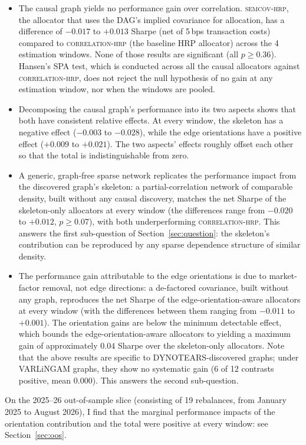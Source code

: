 \documentclass[11pt, a4paper]{report}
\newcommand{\corrhrp}{\textsc{correlation-hrp}}
\newcommand{\semcovhrp}{\textsc{semcov-hrp}}
\begin{document}
\begin{itemize}[itemsep=2pt, topsep=3pt]
  \item The causal graph yields no performance gain over correlation. \semcovhrp{}, the allocator that uses the DAG's implied covariance for allocation, has a difference of $-0.017$ to $+0.013$ Sharpe (net of 5\,bps transaction costs) compared to \corrhrp{} (the baseline HRP allocator) across the 4 estimation windows. None of those results are significant (all $p \geq 0.36$). 
  Hansen's SPA test, which is conducted across all the causal allocators against \corrhrp{}, does not reject the null hypothesis of no gain at any estimation window, nor when the windows are pooled.
  \item Decomposing the causal graph's performance into its two aspects shows that both have consistent relative effects. At every window, the skeleton has a negative effect ($-0.003$ to $-0.028$), while the edge orientations have a positive effect ($+0.009$ to $+0.021$). The two aspects' effects roughly offset each other so that the total is indistinguishable from zero.
  \item A generic, graph-free sparse network replicates the performance impact from the discovered graph's skeleton: a partial-correlation network of comparable density, built without any causal discovery, matches the net Sharpe of the skeleton-only allocators at every window (the differences range from $-0.020$ to $+0.012$, $p \geq 0.07$), with both underperforming \corrhrp{}. This answers the first sub-question of Section~\ref{sec:question}: the skeleton's contribution can be reproduced by any sparse dependence structure of similar density.
  \item The performance gain attributable to the edge orientations is due to market-factor removal, not edge directions: a de-factored covariance, built without any graph, reproduces the net Sharpe of the edge-orientation-aware allocators at every window (with the differences between them ranging from $-0.011$ to $+0.001$). The orientation gains are below the minimum detectable effect, which bounds the edge-orientation-aware allocators to yielding a maximum gain of approximately $0.04$ Sharpe over the skeleton-only allocators. Note that the above results are specific to DYNOTEARS-discovered graphs; under VARLiNGAM graphs, they show no systematic gain (6 of 12 contrasts positive, mean $0.000$). This answers the second sub-question.
\end{itemize}

On the 2025--26 out-of-sample slice (consisting of 19 rebalances, from January 2025 to August 2026), I find that the marginal performance impacts of the orientation contribution and the total were positive at every window: see Section~\ref{sec:oos}.
\end{document}
